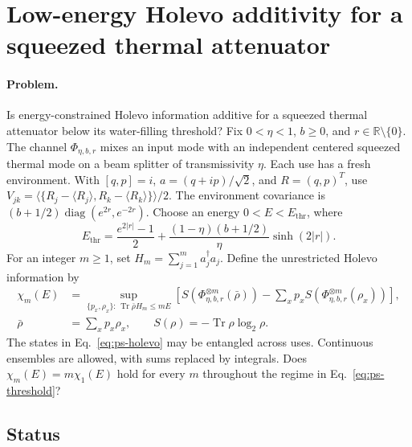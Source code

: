 \section{Low-energy Holevo additivity for a squeezed thermal attenuator}
\label{sec:op_1fc674a1578b1e05}

\paragraph{Problem.}
Is energy-constrained Holevo information additive for a squeezed thermal attenuator below its water-filling threshold?
Fix $0<\eta<1$, $b\geq0$, and $r\in\mathbb R\setminus\{0\}$. The channel $\Phi_{\eta,b,r}$ mixes an input mode with an independent centered squeezed thermal mode on a beam splitter of transmissivity $\eta$. Each use has a fresh environment. With $[q,p]=i$, $a=(q+ip)/\sqrt2$, and $R=(q,p)^T$, use $V_{jk}=\langle\{R_j-\langle R_j\rangle,R_k-\langle R_k\rangle\}\rangle/2$. The environment covariance is $(b+1/2)\operatorname{diag}(e^{2r},e^{-2r})$.
Choose an energy $0<E<E_{\mathrm{thr}}$, where
\begin{equation}
 E_{\mathrm{thr}}=\frac{e^{2|r|}-1}{2}
 +\frac{(1-\eta)(b+1/2)}{\eta}\sinh(2|r|).
 \label{eq:ps-threshold}
\end{equation}
For an integer $m\geq1$, set $H_m=\sum_{j=1}^m a_j^\dagger a_j$. Define the unrestricted Holevo information by
\begin{equation}
 \begin{aligned}
 \chi_m(E)&=\sup_{\{p_x,\rho_x\}:\,\operatorname{Tr}\bar\rho H_m\leq mE}
 \left[S(\Phi_{\eta,b,r}^{\otimes m}(\bar\rho))
 -\sum_xp_xS(\Phi_{\eta,b,r}^{\otimes m}(\rho_x))\right],\\
 \bar\rho&=\sum_xp_x\rho_x,\qquad S(\rho)=-\operatorname{Tr}\rho\log_2\rho.
 \end{aligned}
 \label{eq:ps-holevo}
\end{equation}
The states in Eq.~\eqref{eq:ps-holevo} may be entangled across uses. Continuous ensembles are allowed, with sums replaced by integrals. Does $\chi_m(E)=m\chi_1(E)$ hold for every $m$ throughout the regime in Eq.~\eqref{eq:ps-threshold}?

\subsection*{Status}

